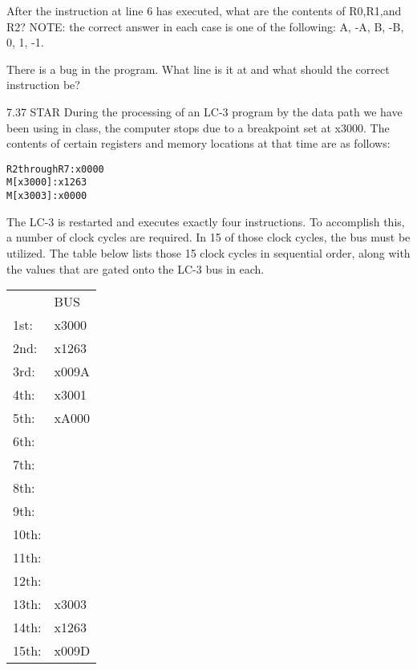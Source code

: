 \documentclass{patt}
\begin{document}
\begin{exercises}
\vspace{.1in}
\noindent 
After the instruction at line 6 has executed, what are the contents of R0,R1,and R2?  NOTE: the correct answer in each case is one of the following: A, -A, B, -B, 0, 1, -1. 

\vspace{.1in} 
\noindent 
There is a bug in the program. What line is it at and what should the correct instruction be? 

\item[7.37]STAR During the processing of an LC-3 program by the data path we have been using in class, the computer stops due to a breakpoint set at x3000.  The contents of certain registers
and memory locations at that time are as follows:
\begin{bf}
\begin{alltt}
    R2 through R7: x0000
         M[x3000]: x1263
         M[x3003]: x0000
\end{alltt}
\end{bf}

\noindent
The LC-3 is restarted and executes exactly four instructions. To accomplish this, a number of clock cycles are required.  In 15 of those clock cycles, the bus must be utilized.  The table
below lists those 15 clock cycles in sequential order, along with the values that are gated onto the LC-3 bus in each.
\begin{table}[h!]
\begin{tabular}{l|p{1cm}|}
\cline{2-2} 
         & BUS    \\[6.1pt] \cline{2-2} 
1st:     & x3000  \\[6.1pt] \cline{2-2}
2nd:     & x1263  \\[6.1pt] \cline{2-2}
3rd:     & x009A  \\[6.1pt] \cline{2-2}
4th:     & x3001  \\[6.1pt] \cline{2-2}
5th:     & xA000  \\[6.1pt] \cline{2-2}
6th:     &        \\[6.1pt] \cline{2-2}
7th:     &        \\[6.1pt] \cline{2-2}
8th:     &        \\[6.1pt] \cline{2-2}
9th:     &        \\[6.1pt] \cline{2-2}
10th:    &        \\[6.1pt] \cline{2-2}
11th:    &        \\[6.1pt] \cline{2-2}
12th:    &        \\[6.1pt] \cline{2-2}
13th:    & x3003  \\[6.1pt] \cline{2-2}
14th:    & x1263  \\[6.1pt] \cline{2-2}
15th:    & x009D  \\[6.1pt] \cline{2-2}
\end{tabular}
\end{table}


\end{exercises}
\end{document}
